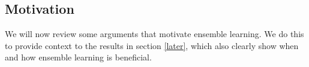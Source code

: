 \documentclass[
    a4paper, %
	fontsize=10pt, %
	twoside=false, %
]{kaobook}
\begin{document}
\begin{titlepage}







\section{Motivation}
\label{sec:ensemble-learning-motivation}

We will now review some arguments that motivate ensemble learning. We do this to provide context to the results in section \ref{later}, which also clearly show when and how ensemble learning is beneficial.


\end{titlepage}
\end{document}
